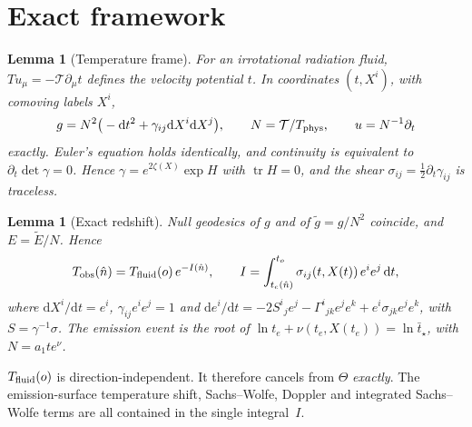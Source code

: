 \documentclass[11pt]{article}
\newtheorem{lemma}[theorem]{Lemma}
\theoremstyle{definition}
\theoremstyle{remark}
\newcommand{\nh}{\hat n}
\newcommand{\dd}{\mathrm{d}}
\newcommand{\T}{\mathcal{T}}
\begin{document}
\section{Exact framework}\label{sec:exact}

\begin{lemma}[Temperature frame]\label{lem:frame}
For an irrotational radiation fluid, $Tu_\mu=-\T\partial_\mu t$ defines the velocity potential
$t$. In coordinates $(t,X^i)$, with comoving labels $X^i$,
\[
g=N^2\big(-\dd t^2+\gamma_{ij}\dd X^i\dd X^j\big),\qquad N=\T/T_{\rm phys},\qquad u=N^{-1}\partial_t
\]
exactly. Euler's equation holds identically, and continuity is equivalent to
$\partial_t\det\gamma=0$. Hence $\gamma=e^{2\zeta(X)}\exp H$ with $\operatorname{tr}H=0$, and
the shear $\sigma_{ij}=\frac12\partial_t\gamma_{ij}$ is traceless.
\end{lemma}

\begin{lemma}[Exact redshift]\label{lem:redshift}
Null geodesics of $g$ and of $\tilde g=g/N^2$ coincide, and $E=\tilde E/N$. Hence
\[
T_{\rm obs}(\nh)=T_{\rm fluid}(o)\,e^{-I(\nh)},\qquad
I=\int_{t_e(\nh)}^{t_o}\sigma_{ij}(t,X(t))\,e^ie^j\,\dd t,
\]
where $\dd X^i/\dd t=e^i$, $\gamma_{ij}e^ie^j=1$ and
$\dd e^i/\dd t=-2S^i{}_je^j-\Gamma^i{}_{jk}e^je^k+e^i\sigma_{jk}e^je^k$, with
$S=\gamma^{-1}\sigma$. The emission event is the root of $\ln t_e+\nu(t_e,X(t_e))=\ln\bar t_\star$,
with $N=a_1te^\nu$.
\end{lemma}

$T_{\rm fluid}(o)$ is direction-independent. It therefore cancels from $\Theta$ \emph{exactly}.
The emission-surface temperature shift, Sachs--Wolfe, Doppler and integrated Sachs--Wolfe terms
are all contained in the single integral~$I$.
\end{document}
